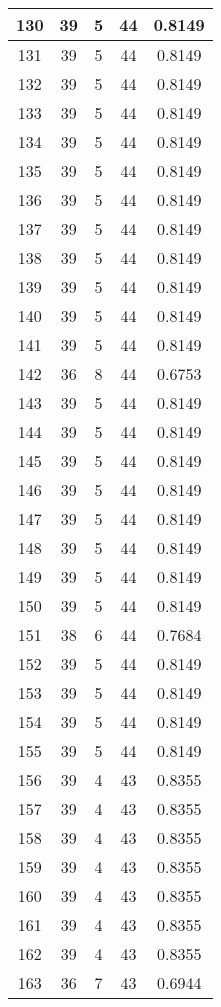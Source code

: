 \documentclass[letterpaper, 12pt]{article}
\begin{document}
\begin{longtable}{|c|c|c|c|c|}
\hline
130 & 39 & 5 & 44 & 0.8149 \\
\hline
131 & 39 & 5 & 44 & 0.8149 \\
\hline
132 & 39 & 5 & 44 & 0.8149 \\
\hline
133 & 39 & 5 & 44 & 0.8149 \\
\hline
134 & 39 & 5 & 44 & 0.8149 \\
\hline
135 & 39 & 5 & 44 & 0.8149 \\
\hline
136 & 39 & 5 & 44 & 0.8149 \\
\hline
137 & 39 & 5 & 44 & 0.8149 \\
\hline
138 & 39 & 5 & 44 & 0.8149 \\
\hline
139 & 39 & 5 & 44 & 0.8149 \\
\hline
140 & 39 & 5 & 44 & 0.8149 \\
\hline
141 & 39 & 5 & 44 & 0.8149 \\
\hline
142 & 36 & 8 & 44 & 0.6753 \\
\hline
143 & 39 & 5 & 44 & 0.8149 \\
\hline
144 & 39 & 5 & 44 & 0.8149 \\
\hline
145 & 39 & 5 & 44 & 0.8149 \\
\hline
146 & 39 & 5 & 44 & 0.8149 \\
\hline
147 & 39 & 5 & 44 & 0.8149 \\
\hline
148 & 39 & 5 & 44 & 0.8149 \\
\hline
149 & 39 & 5 & 44 & 0.8149 \\
\hline
150 & 39 & 5 & 44 & 0.8149 \\
\hline
151 & 38 & 6 & 44 & 0.7684 \\
\hline
152 & 39 & 5 & 44 & 0.8149 \\
\hline
153 & 39 & 5 & 44 & 0.8149 \\
\hline
154 & 39 & 5 & 44 & 0.8149 \\
\hline
155 & 39 & 5 & 44 & 0.8149 \\
\hline
156 & 39 & 4 & 43 & 0.8355 \\
\hline
157 & 39 & 4 & 43 & 0.8355 \\
\hline
158 & 39 & 4 & 43 & 0.8355 \\
\hline
159 & 39 & 4 & 43 & 0.8355 \\
\hline
160 & 39 & 4 & 43 & 0.8355 \\
\hline
161 & 39 & 4 & 43 & 0.8355 \\
\hline
162 & 39 & 4 & 43 & 0.8355 \\
\hline
163 & 36 & 7 & 43 & 0.6944 \\

\end{longtable}
\end{document}
